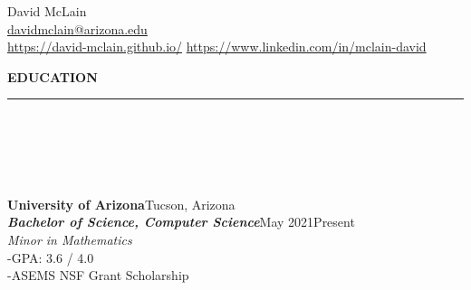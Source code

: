 \documentclass[10pt]{book}
\author{David McLain}
\begin{document}
    {
        \selectfont
        {\centering
            {
                \fontsize{13}{13}
                \selectfont David McLain
                \\
            }
            {
                \fontsize{12}{12}
                \selectfont
                \href{mailto:davidmclain@arizona.edu}{davidmclain@arizona.edu}
                \\
                \href{https://david-mclain.github.io/}{https://david-mclain.github.io/}
                \hspace{1pt}\textbar\hspace{1pt}
                \href{https://www.linkedin.com/in/mclain-david}{https://www.linkedin.com/in/mclain-david}
                \\
            }
        }
        \begin{spacing}{0.2}
            \noindent\fontsize{12}{12}
            \selectfont\hspace{-3pt}\textbf{EDUCATION}
            \\
            \rule{\linewidth}{0.4pt}
            \\
            \\
            \\
            \\
        \end{spacing}
        {
            \fontsize{11}{11}
            \selectfont
            \noindent\textbf{University of Arizona}\hfill Tucson, Arizona
            \\
            \textbf{\textit{Bachelor of Science, Computer Science}}\hfill May 2021\hspace{3pt}\textendash\hspace{3pt}Present
            \\
        }
        \textit{Minor in Mathematics}
        \\
        \hspace{2pt}-\hspace{6pt}GPA: 3.6 / 4.0
        \\
        \hspace{2pt}-\hspace{6pt}ASEMS NSF Grant Scholarship
        \\
}
\end{document}
